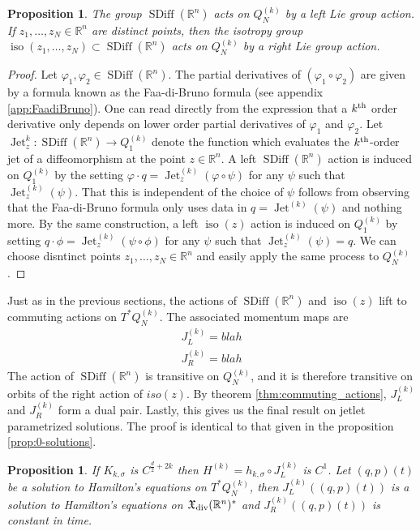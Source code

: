 \documentclass[12pt]{amsart}
\newcommand{\R}{\ensuremath{\mathbb{R}}}
\newtheorem{prop}[thm]{Proposition}
\DeclareMathOperator{\SDiff}{SDiff}
\DeclareMathOperator{\Jet}{Jet}
\DeclareMathOperator{\iso}{iso}
\begin{document}
  \begin{prop}
    The group $\SDiff(\R^n)$ acts on $Q_N^{(k)}$ by a left Lie group
    action.  If $z_1 ,\dots,z_N \in \R^n$ are distinct points,
    then the isotropy group $\iso(z_1,\dots,z_N) \subset \SDiff(\R^n)$
    acts on $Q_N^{(k)}$ by a right Lie group action.
  \end{prop}
  \begin{proof}
    Let $\varphi_1,\varphi_2 \in \SDiff(\R^n)$.
    The partial derivatives of $(\varphi_1 \circ \varphi_2)$
    are given by a formula known as the Faa-di-Bruno formula
    (see appendix \ref{app:FaadiBruno}).
    One can read directly from the expression that
    a $k^{\rm th}$ order derivative only depends on lower order
    partial derivatives of $\varphi_1$ and $\varphi_2$.
    Let $\Jet^k_z: \SDiff(\R^n) \to Q_1^{(k)}$ denote
    the function which evaluates the $k^{\rm th}$-order
    jet of a diffeomorphism at the point $z \in \R^n$.
    A left $\SDiff(\R^n)$ action is induced on $Q_1^{(k)}$ by
    the setting $\varphi \cdot q = \Jet_z^{(k)}( \varphi \circ \psi)$
    for any $\psi$ such that $\Jet^{(k)}_z(\psi)$.
    That this is independent of the choice of $\psi$ follows
    from observing that the Faa-di-Bruno formula
    only uses data in $q = \Jet^{(k)}(\psi)$ and nothing more.
    By the same construction, a left $\iso(z)$ action is induced
    on $Q_1^{(k)}$ by setting $q \cdot \phi = \Jet^{(k)}_z ( \psi \circ \phi)$ for any $\psi$ such that $\Jet_z^{(k)}(\psi) = q$.
    We can choose disntinct points $z_1,\dots,z_N \in \R^n$
    and easily apply the same process to $Q_N^{(k)}$.
  \end{proof}
  
  Just as in the previous sections, the actions of $\SDiff(\R^n)$ and $\iso(z)$ lift to commuting actions on $T^*Q_N^{(k)}$.
  The associated momentum maps are
  \begin{align*}
    J_L^{(k)} = blah \\
    J_R^{(k)} = blah
  \end{align*}
  The action of $\SDiff(\R^n)$ is transitive on $Q_N^{(k)}$,
  and it is therefore transitive on orbits of the right action of $iso(z)$.
  By theorem \ref{thm:commuting_actions}, $J_L^{(k)}$ and $J_R^{(k)}$ form a dual pair.
  Lastly, this gives us the final result on jetlet parametrized solutions.
  The proof is identical to that given in the proposition \ref{prop:0-solutions}.
  \begin{prop}
  	If $K_{k,\sigma}$ is $C^{\frac{d}{2} + 2k}$ then $H^{(k)} = h_{k,\sigma} \circ J_L^{(k)}$
	is $C^1$.
        Let $(q,p)(t)$ be a solution to Hamilton's equations on 
        $T^*Q^{(k)}_N$, then $J_L^{(k)}( (q,p)(t))$ is a solution to Hamilton's
        equations on $\mathfrak{X}_{\rm div}(\R^n)^*$
        and $J_R^{(k)}( (q,p)(t))$ is constant in time.
  \end{prop}
  
\end{document}
